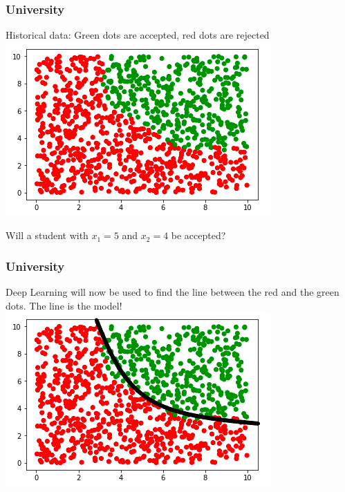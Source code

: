 \begin{frame}[fragile]
  \frametitle{University}
  Historical data: Green dots are accepted, red dots are rejected\\
  \vspace{3mm}
  \includegraphics[scale=0.4]{img/uni_data}\\
  \vspace{3mm}
  \begin{exercise}
  Will a student with $x_1=5$ and $x_2=4$ be accepted?
  \end{exercise}
\end{frame}

\begin{frame}[fragile]
  \frametitle{University}
  Deep Learning will now be used to find the line between the red and the green dots.
  The line is the model!\\
  \vspace{3mm}
  \includegraphics[scale=0.4]{img/uni_data_1}
\end{frame}

